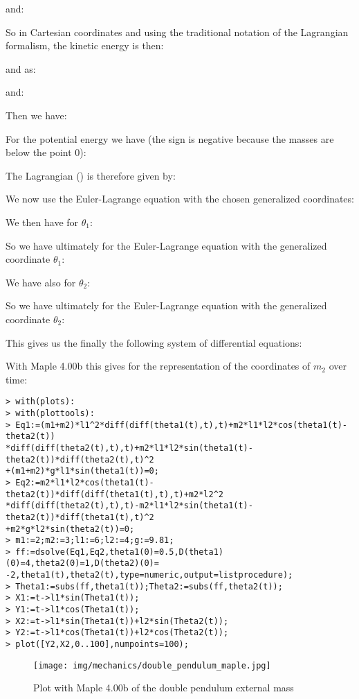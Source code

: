 	and:
	
	So in Cartesian coordinates and using the traditional notation of the Lagrangian formalism, the kinetic energy is then:
	
	and as:
	
	and:
	
	Then we have:
	
	For the potential energy we have (the sign is negative because the masses are below the point $0$):
	
	The Lagrangian () is therefore given by:
	
	We now use the Euler-Lagrange equation with the chosen generalized coordinates:
	
	We then have for $\theta_1$:
	
	So we have ultimately for the Euler-Lagrange equation with the generalized coordinate $\theta_1$:
	
	We have also for $\theta_2$:
	
	So we have ultimately for the Euler-Lagrange equation with the generalized coordinate $\theta_2$:
	
	This gives us the finally the following system of differential equations:
	
	
	With Maple 4.00b this gives for the representation of the coordinates of $m_2$ over time:
	
	\texttt{> with(plots):\\
	> with(plottools):\\
	> Eq1:=(m1+m2)*l1\string^2*diff(diff(theta1(t),t),t)+m2*l1*l2*cos(theta1(t)-theta2(t))\\
	*diff(diff(theta2(t),t),t)+m2*l1*l2*sin(theta1(t)-theta2(t))*diff(theta2(t),t)\string^2\\
	+(m1+m2)*g*l1*sin(theta1(t))=0;\\
	> Eq2:=m2*l1*l2*cos(theta1(t)-theta2(t))*diff(diff(theta1(t),t),t)+m2*l2\string^2\\
	*diff(diff(theta2(t),t),t)-m2*l1*l2*sin(theta1(t)-theta2(t))*diff(theta1(t),t)\string^2\\
	+m2*g*l2*sin(theta2(t))=0;\\
	> m1:=2;m2:=3;l1:=6;l2:=4;g:=9.81;\\
	> ff:=dsolve({Eq1,Eq2,theta1(0)=0.5,D(theta1)(0)=4,theta2(0)=1,D(theta2)(0)=\\
	-2},{theta1(t),theta2(t)},type=numeric,output=listprocedure);\\
	> Theta1:=subs(ff,theta1(t));Theta2:=subs(ff,theta2(t));\\
	> X1:=t->l1*sin(Theta1(t));\\
	> Y1:=t->l1*cos(Theta1(t));\\
	> X2:=t->l1*sin(Theta1(t))+l2*sin(Theta2(t));\\
	> Y2:=t->l1*cos(Theta1(t))+l2*cos(Theta2(t));\\
	> plot([Y2,X2,0..100],numpoints=100);}
	\begin{figure}[H]
		\centering
		\texttt{[image: img/mechanics/double\_pendulum\_maple.jpg]}
		\caption{Plot  with Maple 4.00b of the double pendulum external mass}
	\end{figure}
	
